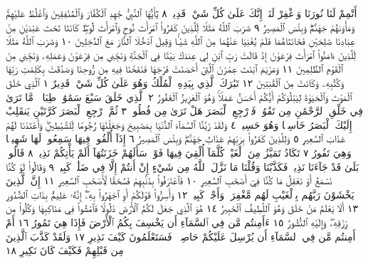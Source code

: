 أَتْمِمْ لَنَا نُورَنَا وَٱغْفِرْ لَنَآۖ إِنَّكَ عَلَىٰ كُلِّ شَيْءࣲ قَدِيرࣱ ٨
يَٰٓأَيُّهَا ٱلنَّبِيُّ جَٰهِدِ ٱلْكُفَّارَ وَٱلْمُنَٰفِقِينَ وَٱغْلُظْ عَلَيْهِمْۚ
وَمَأْوَىٰهُمْ جَهَنَّمُۖ وَبِئْسَ ٱلْمَصِيرُ ٩ ضَرَبَ ٱللَّهُ مَثَلࣰا
لِّلَّذِينَ كَفَرُوا۟ ٱمْرَأَتَ نُوحࣲ وَٱمْرَأَتَ لُوطࣲۖ كَانَتَا تَحْتَ
عَبْدَيْنِ مِنْ عِبَادِنَا صَٰلِحَيْنِ فَخَانَتَاهُمَا فَلَمْ يُغْنِيَا عَنْهُمَا
مِنَ ٱللَّهِ شَيْـࣰٔا وَقِيلَ ٱدْخُلَا ٱلنَّارَ مَعَ ٱلدَّٰخِلِينَ ١٠
وَضَرَبَ ٱللَّهُ مَثَلࣰا لِّلَّذِينَ ءَامَنُوا۟ ٱمْرَأَتَ فِرْعَوْنَ إِذْ
قَالَتْ رَبِّ ٱبْنِ لِي عِندَكَ بَيْتࣰا فِي ٱلْجَنَّةِ وَنَجِّنِي مِن فِرْعَوْنَ
وَعَمَلِهِۦ وَنَجِّنِي مِنَ ٱلْقَوْمِ ٱلظَّٰلِمِينَ ١١ وَمَرْيَمَ ٱبْنَتَ
عِمْرَٰنَ ٱلَّتِيٓ أَحْصَنَتْ فَرْجَهَا فَنَفَخْنَا فِيهِ مِن رُّوحِنَا
وَصَدَّقَتْ بِكَلِمَٰتِ رَبِّهَا وَكُتُبِهِۦ وَكَانَتْ مِنَ ٱلْقَٰنِتِينَ ١٢
تَبَٰرَكَ ٱلَّذِي بِيَدِهِ ٱلْمُلْكُ وَهُوَ عَلَىٰ كُلِّ شَيْءࣲ قَدِيرٌ ١ ٱلَّذِي خَلَقَ
ٱلْمَوْتَ وَٱلْحَيَوٰةَ لِيَبْلُوَكُمْ أَيُّكُمْ أَحْسَنُ عَمَلࣰاۚ وَهُوَ ٱلْعَزِيزُ ٱلْغَفُورُ ٢
ٱلَّذِي خَلَقَ سَبْعَ سَمَٰوَٰتࣲ طِبَاقࣰاۖ مَّا تَرَىٰ فِي خَلْقِ ٱلرَّحْمَٰنِ مِن
تَفَٰوُتࣲۖ فَٱرْجِعِ ٱلْبَصَرَ هَلْ تَرَىٰ مِن فُطُورࣲ ٣ ثُمَّ ٱرْجِعِ ٱلْبَصَرَ كَرَّتَيْنِ
يَنقَلِبْ إِلَيْكَ ٱلْبَصَرُ خَاسِئࣰا وَهُوَ حَسِيرࣱ ٤ وَلَقَدْ زَيَّنَّا ٱلسَّمَآءَ
ٱلدُّنْيَا بِمَصَٰبِيحَ وَجَعَلْنَٰهَا رُجُومࣰا لِّلشَّيَٰطِينِۖ وَأَعْتَدْنَا لَهُمْ عَذَابَ
ٱلسَّعِيرِ ٥ وَلِلَّذِينَ كَفَرُوا۟ بِرَبِّهِمْ عَذَابُ جَهَنَّمَۖ وَبِئْسَ ٱلْمَصِيرُ ٦
إِذَآ أُلْقُوا۟ فِيهَا سَمِعُوا۟ لَهَا شَهِيقࣰا وَهِيَ تَفُورُ ٧ تَكَادُ تَمَيَّزُ
مِنَ ٱلْغَيْظِۖ كُلَّمَآ أُلْقِيَ فِيهَا فَوْجࣱ سَأَلَهُمْ خَزَنَتُهَآ أَلَمْ يَأْتِكُمْ نَذِيرࣱ ٨
قَالُوا۟ بَلَىٰ قَدْ جَآءَنَا نَذِيرࣱ فَكَذَّبْنَا وَقُلْنَا مَا نَزَّلَ ٱللَّهُ مِن شَيْءٍ إِنْ أَنتُمْ
إِلَّا فِي ضَلَٰلࣲ كَبِيرࣲ ٩ وَقَالُوا۟ لَوْ كُنَّا نَسْمَعُ أَوْ نَعْقِلُ مَا كُنَّا فِيٓ أَصْحَٰبِ
ٱلسَّعِيرِ ١٠ فَٱعْتَرَفُوا۟ بِذَنۢبِهِمْ فَسُحْقࣰا لِّأَصْحَٰبِ ٱلسَّعِيرِ ١١ إِنَّ
ٱلَّذِينَ يَخْشَوْنَ رَبَّهُم بِٱلْغَيْبِ لَهُم مَّغْفِرَةࣱ وَأَجْرࣱ كَبِيرࣱ ١٢
وَأَسِرُّوا۟ قَوْلَكُمْ أَوِ ٱجْهَرُوا۟ بِهِۦٓۖ إِنَّهُۥ عَلِيمُۢ بِذَاتِ ٱلصُّدُورِ ١٣ أَلَا
يَعْلَمُ مَنْ خَلَقَ وَهُوَ ٱللَّطِيفُ ٱلْخَبِيرُ ١٤ هُوَ ٱلَّذِي جَعَلَ لَكُمُ ٱلْأَرْضَ
ذَلُولࣰا فَٱمْشُوا۟ فِي مَنَاكِبِهَا وَكُلُوا۟ مِن رِّزْقِهِۦۖ وَإِلَيْهِ ٱلنُّشُورُ ١٥
ءَأَمِنتُم مَّن فِي ٱلسَّمَآءِ أَن يَخْسِفَ بِكُمُ ٱلْأَرْضَ فَإِذَا هِيَ تَمُورُ ١٦
أَمْ أَمِنتُم مَّن فِي ٱلسَّمَآءِ أَن يُرْسِلَ عَلَيْكُمْ حَاصِبࣰاۖ فَسَتَعْلَمُونَ
كَيْفَ نَذِيرِ ١٧ وَلَقَدْ كَذَّبَ ٱلَّذِينَ مِن قَبْلِهِمْ فَكَيْفَ كَانَ نَكِيرِ ١٨
